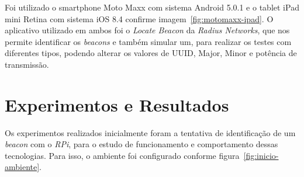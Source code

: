 \documentclass[
	12pt,				%
	openright,			%
	oneside,			%
	a4paper,			%
	chapter=TITLE,		%
	english,			%
	brazil				%
	]{abntex2}
\begin{document}
{Foi utilizado o smartphone Moto Maxx com sistema Android 5.0.1 e o tablet iPad mini Retina com sistema iOS 8.4 confirme imagem~\ref{fig:motomaxx-ipad}. O aplicativo utilizado em ambos foi o \textit{Locate Beacon} da \textit{Radius Networks}, que nos permite identificar os \textit{beacons} e também simular um, para realizar os testes com diferentes tipos, podendo alterar os valores de UUID, Major, Minor e potência de transmissão.

\begin{figure}[htb]
\end{figure}



\chapter{Experimentos e Resultados}

Os experimentos realizados inicialmente foram a tentativa de identificação de um \textit{beacon} com o \textit{RPi}, para o estudo de funcionamento e comportamento dessas tecnologias. Para isso, o ambiente foi configurado conforme figura~\ref{fig:inicio-ambiente}. 

}
\end{document}
